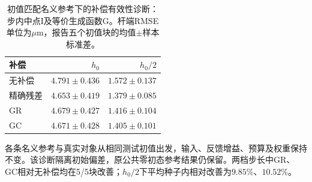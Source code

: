 \begin{table}[t]
\centering\small
\caption{初值匹配名义参考下的补偿有效性诊断：步内中点I及等价生成函数G。杆端RMSE单位为$\mu\mathrm m$，报告五个初值块的均值$\pm$样本标准差。}
\label{tab:matched_initial_effectiveness}
\begin{tabular}{lrr}
\toprule
补偿 & $h_0$ & $h_0/2$ \\
\midrule
无补偿 & $4.791\pm0.436$ & $1.572\pm0.137$ \\
精确残差 & $4.653\pm0.419$ & $1.379\pm0.085$ \\
GR & $4.679\pm0.427$ & $1.416\pm0.104$ \\
GC & $4.671\pm0.428$ & $1.405\pm0.101$ \\
\bottomrule
\end{tabular}
\par\smallskip\begin{minipage}{\columnwidth}\footnotesize 各条名义参考与真实对象从相同测试初值出发，输入、反馈增益、预算及权重保持不变。该诊断隔离初始偏差，原公共零初态参考结果仍保留。两档步长中GR、GC相对无补偿均在5/5块改善；$h_0/2$下平均种子内相对改善为$9.85\%$、$10.52\%$。\end{minipage}
\end{table}
